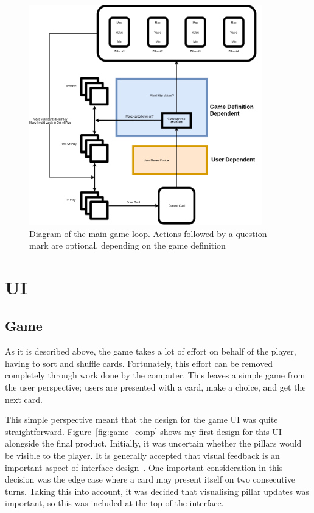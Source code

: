 \begin{figure}[!h]
	\centering
	\includegraphics[width=0.9\textwidth]{./images/design/diag.png}
	\caption{Diagram of the main game loop. Actions followed by a question mark are optional, depending on the game definition}
	\label{fig:diag}
\end{figure}

\section{UI}

\subsection{Game}
As it is described above, the game takes a lot of effort on behalf of the player, having to sort and shuffle cards. Fortunately, this effort can be removed completely through work done by the computer. This leaves a simple game from the user perspective; users are presented with a card, make a choice, and get the next card.

This simple perspective meant that the design for the game UI was quite straightforward. Figure~\ref{fig:game_comp} shows my first design for this UI alongside the final product. Initially, it was uncertain whether the pillars would be visible to the player. It is generally accepted that visual feedback is an important aspect of interface design~\cite{fb}. One important consideration in this decision was the  edge case where a card may present itself on two consecutive turns. Taking this into account, it was decided that visualising pillar updates was important, so this was included at the top of the interface.

